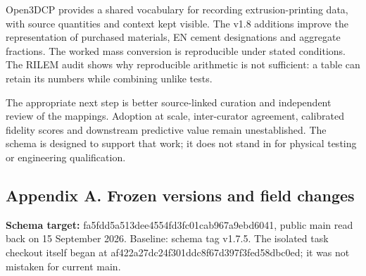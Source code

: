 \documentclass[
  american,
  11pt,
  letterpaper,
]{article}
\renewcommand{\texttt}[1]{{\ttfamily\fontsize{9.5}{11}\selectfont\hyphenchar\font=-1 #1}}
\begin{document}
Open3DCP provides a shared vocabulary for recording extrusion-printing
data, with source quantities and context kept visible. The v1.8
additions improve the representation of purchased materials, EN cement
designations and aggregate fractions. The worked mass conversion is
reproducible under stated conditions. The RILEM audit shows why
reproducible arithmetic is not sufficient: a table can retain its
numbers while combining unlike tests.

The appropriate next step is better source-linked curation and
independent review of the mappings. Adoption at scale, inter-curator
agreement, calibrated fidelity scores and downstream predictive value
remain unestablished. The schema is designed to support that work; it
does not stand in for physical testing or engineering qualification.

\newpage

\subsection{Appendix A. Frozen versions and field
changes}\label{appendix-a.-frozen-versions-and-field-changes}

\textbf{Schema target:}
\texttt{fa5fdd5a513dee4554fd3fc01cab967a9ebd6041}, public main read back
on 15 September 2026. Baseline: schema tag v1.7.5. The isolated task
checkout itself began at
\texttt{af422a27dc24f301ddc8f67d397f3fed58dbc0ed}; it was not mistaken
for current main.
\end{document}
